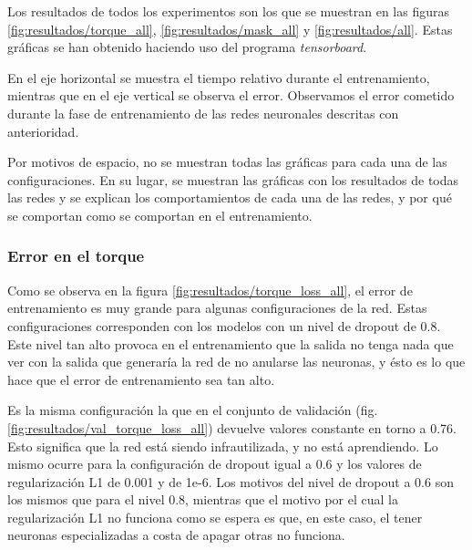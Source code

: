 Los resultados de todos los experimentos son los que se muestran en las figuras \ref{fig:resultados/torque_all}, \ref{fig:resultados/mask_all} y \ref{fig:resultados/all}. Estas gráficas se han obtenido haciendo uso del programa \textit{tensorboard}.

En el eje horizontal se muestra el tiempo relativo durante el entrenamiento, mientras que en el eje vertical se observa el error. Observamos el error cometido durante la fase de entrenamiento de las redes neuronales descritas con anterioridad.

Por motivos de espacio, no se muestran todas las gráficas para cada una de las configuraciones. En su lugar, se muestran las gráficas con los resultados de todas las redes y se explican los comportamientos de cada una de las redes, y por qué se comportan como se comportan en el entrenamiento.

\subsubsection{Error en el torque}
Como se observa en la figura \ref{fig:resultados/torque_loss_all}, el error de entrenamiento es muy grande para algunas configuraciones de la red. Estas configuraciones corresponden con los modelos con un nivel de dropout de 0.8. Este nivel tan alto provoca en el entrenamiento que la salida no tenga nada que ver con la salida que generaría la red de no anularse las neuronas, y ésto es lo que hace que el error de entrenamiento sea tan alto.

Es la misma configuración la que en el conjunto de validación (fig. \ref{fig:resultados/val_torque_loss_all}) devuelve valores constante en torno a 0.76. Esto significa que la red está siendo infrautilizada, y no está aprendiendo. Lo mismo ocurre para la configuración de dropout igual a 0.6 y los valores de regularización L1 de 0.001 y de 1e-6. Los motivos del nivel de dropout a 0.6 son los mismos que para el nivel 0.8, mientras que el motivo por el cual la regularización L1 no funciona como se espera es que, en este caso, el tener neuronas especializadas a costa de apagar otras no funciona.


